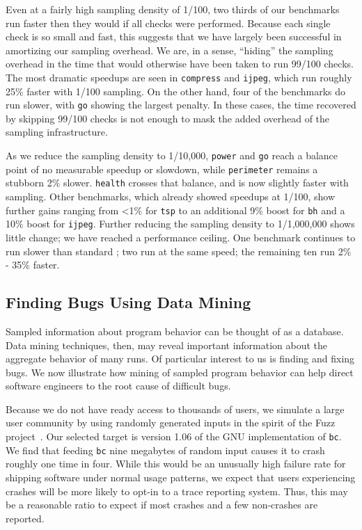 Even at a fairly high sampling density of 1/100, two thirds of our
benchmarks run faster then they would if all checks were performed.
Because each single check is so small and fast, this suggests that we
have largely been successful in amortizing our sampling overhead.  We
are, in a sense, ``hiding'' the sampling overhead in the time that
would otherwise have been taken to run 99/100 checks.  The most
dramatic speedups are seen in \texttt{compress} and \texttt{ijpeg},
which run roughly 25\% faster with 1/100 sampling.  On the other hand,
four of the benchmarks do run slower, with \texttt{go} showing the
largest penalty.  In these cases, the time recovered by skipping
99/100 checks is not enough to mask the added overhead of the sampling
infrastructure.

As we reduce the sampling density to 1/10,000, \texttt{power} and
\texttt{go} reach a balance point of no measurable speedup or
slowdown, while \texttt{perimeter} remains a stubborn 2\% slower.
\texttt{health} crosses that balance, and is now slightly faster with
sampling.  Other benchmarks, which already showed speedups at 1/100,
show further gains ranging from <1\% for \texttt{tsp} to an additional
9\% boost for \texttt{bh} and a 10\% boost for \texttt{ijpeg}.
Further reducing the sampling density to 1/1,000,000 shows little
change; we have reached a performance ceiling.  One benchmark
continues to run slower than standard \ccured; two run at the same
speed; the remaining ten run 2\% - 35\% faster.


\subsection{Finding Bugs Using Data Mining}

Sampled information about program behavior can be thought of as a
database.  Data mining techniques, then, may reveal important
information about the aggregate behavior of many runs.  Of particular
interest to us is finding and fixing bugs.  We now illustrate how
mining of sampled program behavior can help direct software engineers
to the root cause of difficult bugs.

Because we do not have ready access to thousands of users, we simulate
a large user community by using randomly generated inputs in the
spirit of the Fuzz project~\cite{MKLMMNS95}.  Our selected target is
version 1.06 of the GNU implementation of \texttt{bc}.  We find that
feeding \texttt{bc} nine megabytes of random input causes it to crash
roughly one time in four.  While this would be an unusually high
failure rate for shipping software under normal usage patterns, we
expect that users experiencing crashes will be more likely to opt-in
to a trace reporting system.  Thus, this may be a reasonable ratio to
expect if most crashes and a few non-crashes are reported.

